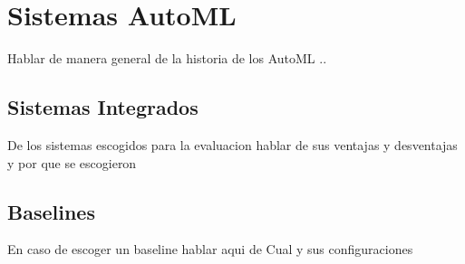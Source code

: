 \chapter{Sistemas AutoML}\label{chapter:AutoML}
Hablar de manera general de la historia de los AutoML ..
\section{Sistemas Integrados}\label{section:systems}
De los sistemas escogidos para la evaluacion hablar de sus ventajas y desventajas y por que se escogieron
\section{Baselines}\label{section:baselines}
En caso de escoger un baseline hablar aqui de Cual y sus configuraciones 